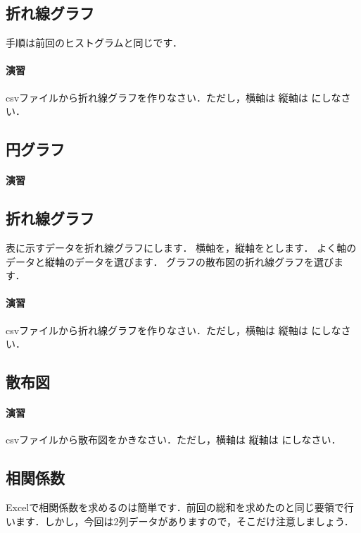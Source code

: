 \subsection{折れ線グラフ}

手順は前回のヒストグラムと同じです．

\paragraph{演習}
csvファイルから折れ線グラフを作りなさい．ただし，横軸は 縦軸は にしなさい．

\subsection{円グラフ}

\paragraph{演習}


\subsection{折れ線グラフ}

表に示すデータを折れ線グラフにします．
横軸を，縦軸をとします．
よく軸のデータと縦軸のデータを選びます．
グラフの散布図の折れ線グラフを選びます．

\paragraph{演習}
csvファイルから折れ線グラフを作りなさい．ただし，横軸は 縦軸は にしなさい．


\subsection{散布図}

\paragraph{演習}

csvファイルから散布図をかきなさい．ただし，横軸は 縦軸は にしなさい．


\subsection{相関係数}

Excelで相関係数を求めるのは簡単です．前回の総和を求めたのと同じ要領で行います．しかし，今回は2列データがありますので，そこだけ注意しましょう．

